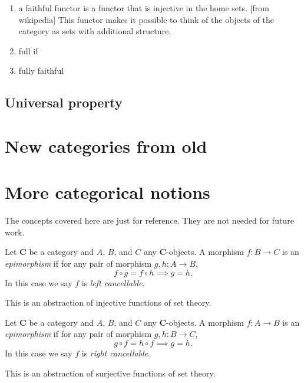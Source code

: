 \begin{definition}
    \begin{enumerate}[label=(\roman*)]
        \item a faithful functor is a functor that is injective in the home sets. [from wikipedia] This functor makes it possible to think of the objects of the category as sets with additional structure,
        \item full if 
        \item fully faithful
    \end{enumerate}
     
    
    
\end{definition}






\subsection{Universal property}


\section{New categories from old}


\section{More categorical notions}

The concepts covered here are just for reference. 
They are not needed for future work.

\begin{definition}[Monomorphism]
    Let \(\mathbf{C}\) be a category and \(A\), \(B\), and \(C\) any   \(\mathbf{C}\)-objects.
    A morphism \(f\colon B\to C\) is an \textit{epimorphism} if for any pair of morphism \(g,h\colon A\to B\), \[f\circ g = f\circ h\implies g=h.\]
    In this case we say \(f\) is \textit{left cancellable}.
\end{definition}
\begin{remark}
    This is an abstraction of injective functions of set theory.
\end{remark}


\begin{definition}[Epimorphism]
    Let \(\mathbf{C}\) be a category and \(A\), \(B\), and \(C\) any   \(\mathbf{C}\)-objects.
    A morphism \(f\colon A\to B\) is an \textit{epimorphism} if for any pair of morphism \(g,h\colon B\to C\), \[g\circ f = h\circ f \implies g=h.\]
    In this case we say \(f\) is \textit{right cancellable}.
\end{definition}
\begin{remark}
    This is an abstraction of surjective functions of set theory.
\end{remark}



